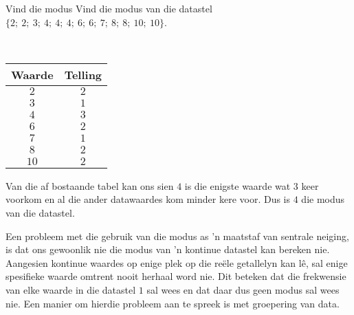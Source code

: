 \begin{wex}{Vind die modus}
{Vind die modus van die datastel $\{2;\ 2;\ 3;\ 4;\ 4;\ 4;\ 6;\ 6;\ 7;\ 8;\ 8;\ 10;\ 10\}$.}
{
\\
  \begin{center}
    \begin{tabular}{|c|c|} \hline
      \textbf{Waarde} & \textbf{Telling} \\ \hline

      $2$ & $2$ \\ \hline
      $3$ & $1$ \\\hline 
      $4$ & $3$ \\\hline
      $6$ & $2$ \\\hline
      $7$ & $1$ \\\hline
      $8$ & $2$ \\\hline
      $10$ & $2$ \\\hline

    \end{tabular}
  \end{center}


  Van die af bostaande tabel kan ons sien $4$ is die enigste waarde wat $3$ keer voorkom en al die ander datawaardes kom minder kere voor. Dus is $4$ die modus van die datastel.
}
\end{wex}

Een probleem met die gebruik van die modus as ’n maatstaf van sentrale neiging, is dat ons gewoonlik nie die modus van ’n kontinue datastel kan bereken nie. Aangesien kontinue waardes op enige plek op die reële getallelyn kan lê, sal enige spesifieke waarde omtrent nooit herhaal word nie. Dit beteken dat die frekwensie van elke waarde in die datastel $1$ sal wees en dat daar dus geen modus sal wees nie. Een manier om hierdie probleem aan te spreek is met groepering van data.


